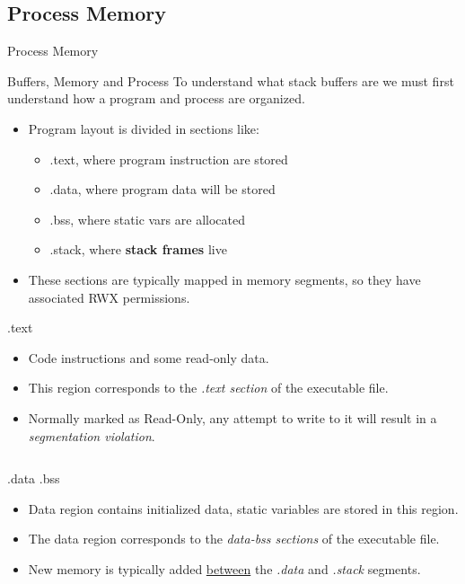\subsection{Process Memory}

\begin{frame}{Process Memory}

\begin{block}{Buffers, Memory and Process}
To understand what stack buffers are we must first understand how a
program and process are organized.
\end{block}

\begin{itemize}
\item Program layout is divided in sections like:
	\begin{itemize}
		\item .text, where program instruction are stored
		\item .data, where program data will be stored
		\item .bss, where static vars are allocated
		\item .stack, where {\bf stack frames} live
	\end{itemize}
\item These sections are typically mapped in memory segments, so they have associated RWX permissions.
\end{itemize}

\framebreak

\begin{block}{.text}
\begin{itemize}
\item Code instructions and some read-only data.  
\item This region corresponds to the \emph{.text section} of the executable file.
\item Normally marked as Read-Only, any attempt to write to it will result in a \emph{segmentation violation}.
\end{itemize}
\end{block}


\framebreak
\begin{columns}[T]
	\begin{column}{.6\textwidth}
\begin{block}{.data .bss}
\begin{itemize}
\item Data region contains initialized data, static variables are stored in this region. 
\item The data region corresponds to the \emph{data-bss sections} of the executable file.
\item New memory is typically added \underline{between} the \emph{.data} and \emph{.stack} segments.
\end{itemize}
\end{block}


\end{column}
\end{columns}
\end{frame}
